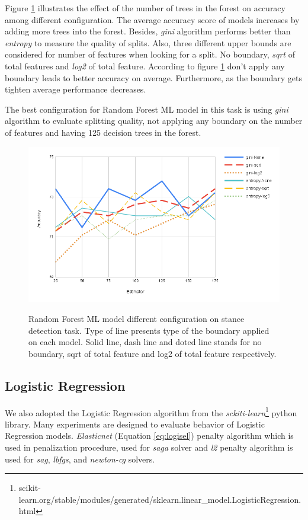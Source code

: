 Figure \ref{fig:randomforest} illustrates the effect of the number of trees in the forest on accuracy among different configuration. The average accuracy score of models increases by adding more trees into the forest. Besides, \textit{gini} algorithm performs better than \textit{entropy} to measure the quality of splits. Also, three different upper bounds are considered for number of features when looking for a split. No boundary, \textit{sqrt} of total features and \textit{log2} of total feature. According to figure \ref{fig:randomforest} don't apply any boundary leads to better accuracy on average. Furthermore, as the boundary gets tighten average performance decreases. 

The best configuration for Random Forest \ac{ML} model in this task is using \textit{gini} algorithm to evaluate splitting quality, not applying any boundary on the number of features and having 125 decision trees in the forest. 
\begin{figure}%
	\centering
	{\includegraphics[width=12.5cm]{statistics/randomforest.png} }
	\caption{Random Forest \ac{ML} model different configuration on stance detection task. Type of line presents type of the boundary applied on each model. Solid line, dash line and doted line stands for no boundary, sqrt of total feature and log2 of total feature respectively.}%
	\label{fig:randomforest}%
\end{figure}
\subsection{Logistic Regression}
We also adopted the Logistic Regression algorithm from the \textit{sckiti-learn}\footnote{scikit-learn.org/stable/modules/generated/sklearn.linear\_model.LogisticRegression.html} python library. Many experiments are designed to evaluate behavior of Logistic Regression models. 	 \textit{Elasticnet} (Equation \ref{eq:logisel}) penalty algorithm which is used in penalization procedure, used for \textit{saga} solver and \textit{l2} penalty algorithm is used for \textit{sag}, \textit{lbfgs}, and \textit{newton-cg} solvers. 

